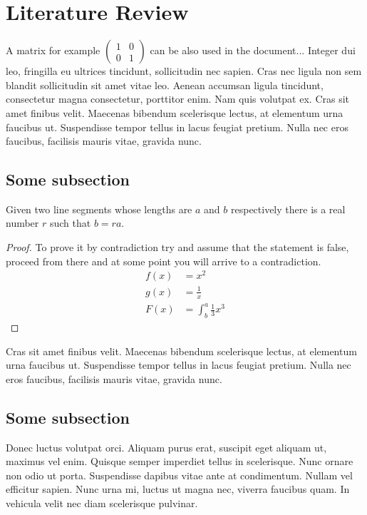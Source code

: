 \section{Literature Review}

A matrix for example $\begin{pmatrix}
	1 & 0\\
	0 & 1
\end{pmatrix}$ can be also used in the document... Integer dui leo, fringilla eu ultrices tincidunt, sollicitudin nec sapien. Cras nec ligula non sem blandit sollicitudin sit amet vitae leo. Aenean accumsan ligula tincidunt, consectetur magna consectetur, porttitor enim. Nam quis volutpat ex. Cras sit amet finibus velit. Maecenas bibendum scelerisque lectus, at elementum urna faucibus ut. Suspendisse tempor tellus in lacus feugiat pretium. Nulla nec eros faucibus, facilisis mauris vitae, gravida nunc.

\subsection{Some subsection}
\lipsum[10]
\begin{lemma}
	Given two line segments whose lengths are $a$ and $b$ respectively there 
	is a real number $r$ such that $b=ra$.
\end{lemma}

\begin{proof}
	To prove it by contradiction try and assume that the statement is false,
	proceed from there and at some point you will arrive to a contradiction.
	\begin{align*}
	f(x) &= x^2\\
	g(x) &= \frac{1}{x}\\
	F(x) &= \int^a_b \frac{1}{3}x^3
	\end{align*}
\end{proof}
Cras sit amet finibus velit. Maecenas bibendum scelerisque lectus, at elementum urna faucibus ut. Suspendisse tempor tellus in lacus feugiat pretium. Nulla nec eros faucibus, facilisis mauris vitae, gravida nunc.

\subsection{Some subsection}
 Donec luctus volutpat orci. Aliquam purus erat, suscipit eget aliquam ut, maximus vel enim. Quisque semper imperdiet tellus in scelerisque. Nunc ornare non odio ut porta. Suspendisse dapibus vitae ante at condimentum. Nullam vel efficitur sapien. Nunc urna mi, luctus ut magna nec, viverra faucibus quam. In vehicula velit nec diam scelerisque pulvinar.
 
